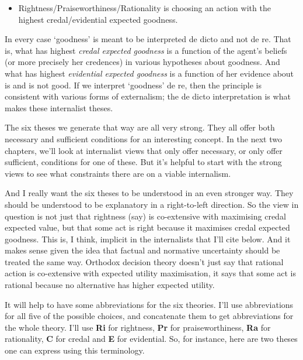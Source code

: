\begin{itemize}
\item{} Rightness\slash Praiseworthiness\slash Rationality is choosing an action with the highest credal\slash evidential expected goodness.

\end{itemize}
In every case `goodness' is meant to be interpreted de dicto and not de re. That is, what has highest \emph{credal expected goodness} is a function of the agent's beliefs (or more precisely her credences) in various hypotheses about goodness. And what has highest \emph{evidential expected goodness} is a function of her evidence about is and is not good. If we interpret `goodness' de re, then the principle is consistent with various forms of externalism; the de dicto interpretation is what makes these internalist theses.

The six theses we generate that way are all very strong. They all offer both necessary and sufficient conditions for an interesting concept. In the next two chapters, we'll look at internalist views that only offer necessary, or only offer sufficient, conditions for one of these. But it's helpful to start with the strong views to see what constraints there are on a viable internalism.

And I really want the six theses to be understood in an even stronger way. They should be understood to be explanatory in a right-to-left direction. So the view in question is not just that rightness (say) is co-extensive with maximising credal expected value, but that some act is right because it maximises credal expected goodness. This is, I think, implicit in the internalists that I'll cite below. And it makes sense given the idea that factual and normative uncertainty should be treated the same way. Orthodox decision theory doesn't just say that rational action is co-extensive with expected utility maximisation, it says that some act is rational because no alternative has higher expected utility.

It will help to have some abbreviations for the six theories. I'll use abbreviations for all five of the possible choices, and concatenate them to get abbreviations for the whole theory. I'll use \textbf{Ri} for rightness, \textbf{Pr} for praiseworthiness, \textbf{Ra} for rationality, \textbf{C} for credal and \textbf{E} for evidential. So, for instance, here are two theses one can express using this terminology.


